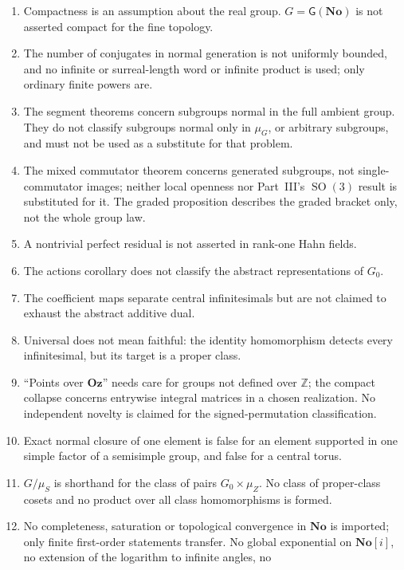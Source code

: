 \documentclass[11pt,letterpaper]{article}
\numberwithin{equation}{section}
\theoremstyle{definition}
\theoremstyle{remark}
\newcommand{\No}{\mathbf{No}}
\newcommand{\Z}{\mathbb Z}
\newcommand{\Oz}{\mathbf{Oz}}
\newcommand{\SO}{\operatorname{SO}}
\newcommand{\sG}{\mathsf G}
\begin{document}
\begin{enumerate}[label=\textup{P\arabic*.},leftmargin=2.6em]
 proper-class consequence is a contrast, not a new simplicity theorem.
 Determinant is not claimed to be a set-sized universal quotient, and its
 abstract set-valued characters are not classified.
\item Compactness is an assumption about the real group. $G=\sG(\No)$ is not
 asserted compact for the fine topology.
\item The number of conjugates in normal generation is not uniformly bounded,
 and no infinite or surreal-length word or infinite product is used; only
 ordinary finite powers are.
\item The segment theorems concern subgroups normal in the full ambient group.
 They do not classify subgroups normal only in $\mu_G$, or arbitrary
 subgroups, and must not be used as a substitute for that problem.
\item The mixed commutator theorem concerns generated subgroups, not
 single-commutator images; neither local openness nor Part~III's $\SO(3)$
 result is substituted for it. The graded proposition describes the graded
 bracket only, not the whole group law.
\item A nontrivial perfect residual is not asserted in rank-one Hahn fields.
\item The actions corollary does not classify the abstract representations of
 $G_0$.
\item The coefficient maps separate central infinitesimals but are not claimed
 to exhaust the abstract additive dual.
\item Universal does not mean faithful: the identity homomorphism detects every
 infinitesimal, but its target is a proper class.
\item ``Points over $\Oz$'' needs care for groups not defined over $\Z$; the
 compact collapse concerns entrywise integral matrices in a chosen realization.
 No independent novelty is claimed for the signed-permutation classification.
\item Exact normal closure of one element is false for an element supported in
 one simple factor of a semisimple group, and false for a central torus.
\item $G/\mu_S$ is shorthand for the class of pairs $G_0\times\mu_Z$. No class
 of proper-class cosets and no product over all class homomorphisms is formed.
\item No completeness, saturation or topological convergence in $\No$ is
 imported; only finite first-order statements transfer. No global exponential
 on $\No[i]$, no extension of the logarithm to infinite angles, no

\end{enumerate}
\end{document}
